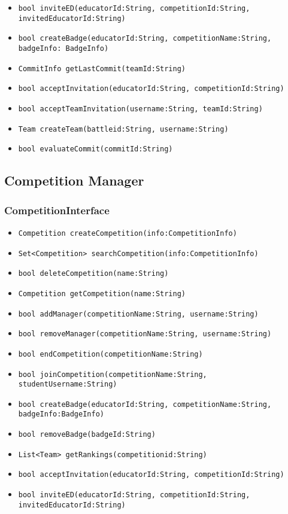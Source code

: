 \begin{itemize}
    \item \texttt{bool inviteED(educatorId:String, competitionId:String, invitedEducatorId:String)}%
    \item \texttt{bool createBadge(educatorId:String, competitionName:String, badgeInfo: BadgeInfo)}%
    \item \texttt{CommitInfo getLastCommit(teamId:String)}%
    \item \texttt{bool acceptInvitation(educatorId:String, competitionId:String)}%
    \item \texttt{bool acceptTeamInvitation(username:String, teamId:String)}%
    \item \texttt{Team createTeam(battleid:String, username:String)}%
    \item \texttt{bool evaluateCommit(commitId:String)}%
\end{itemize}

\subsection{Competition Manager}
\subsubsection{CompetitionInterface}
\begin{itemize}
    \item \texttt{Competition createCompetition(info:CompetitionInfo)}%
    \item \texttt{Set<Competition> searchCompetition(info:CompetitionInfo)}
    \item \texttt{bool deleteCompetition(name:String)}
    \item \texttt{Competition getCompetition(name:String)}%
    \item \texttt{bool addManager(competitionName:String, username:String)}%
    \item \texttt{bool removeManager(competitionName:String, username:String)}
    \item \texttt{bool endCompetition(competitionName:String)}
    \item \texttt{bool joinCompetition(competitionName:String, studentUsername:String)}%
    \item \texttt{bool createBadge(educatorId:String, competitionName:String,\\badgeInfo:BadgeInfo)}%
    \item \texttt{bool removeBadge(badgeId:String)}
    \item \texttt{List<Team> getRankings(competitionid:String)}
    \item \texttt{bool acceptInvitation(educatorId:String, competitionId:String)}%
    \item \texttt{bool inviteED(educatorId:String, competitionId:String,\\invitedEducatorId:String)}%
\end{itemize}

